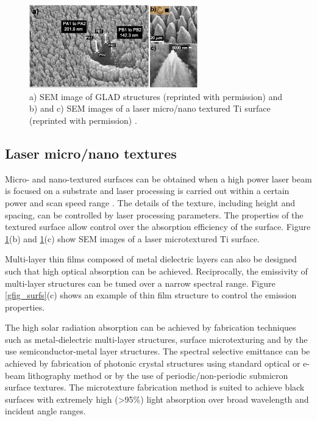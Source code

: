 \documentclass[review]{elsarticle}
\begin{document}
\begin{figure}[ht]
	\includegraphics[width=0.65\textwidth]{gfig45_comb}
	\caption{\label{gfig45_comb} a) SEM image of GLAD structures (reprinted with permission) \cite{gfig4ref} and b) and c) SEM images of a laser micro/nano textured Ti surface (reprinted with permission) \cite{g28}.} %
\end{figure} 

\subsection{Laser micro/nano textures}
Micro- and nano-textured surfaces can be obtained when a high power laser beam is 
focused on a substrate and laser processing is carried out within a certain power 
and scan speed range \cite{g28}.  The details of the texture, including height and spacing, can be controlled by laser processing parameters.  The properties of the textured surface allow control over the absorption efficiency of the surface. Figure \ref{gfig45_comb}(b) and \ref{gfig45_comb}(c) show SEM images of a laser microtextured Ti surface. 

Multi-layer thin films composed of metal dielectric layers can also be designed such that high optical absorption can be achieved.  Reciprocally, the emissivity of multi-layer structures can be tuned over a narrow spectral range. Figure \ref{gfig_surfs}(c) shows an example of thin film structure to control the emission properties. 

The high solar radiation absorption can be achieved by fabrication techniques such as metal-dielectric multi-layer structures, surface microtexturing and by the use semiconductor-metal layer structures. The spectral selective emittance can be achieved by fabrication of photonic crystal structures using standard optical or e-beam lithography method or by the use of periodic/non-periodic submicron surface textures.  The microtexture fabrication method is suited to achieve black surfaces with extremely high (\textgreater95\%) light absorption over broad wavelength and incident angle ranges.
\end{document}
